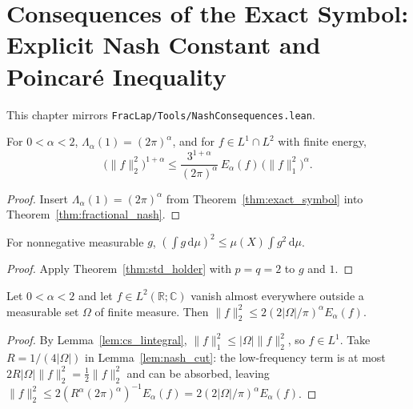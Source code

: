 \chapter{Consequences of the Exact Symbol: Explicit Nash Constant and Poincaré Inequality}

This chapter mirrors \texttt{FracLap/Tools/NashConsequences.lean}.

\begin{theorem}\label{thm:nash_explicit}
\leanok
For $0 < \alpha < 2$, $\Lambda_\alpha(1) = (2\pi)^\alpha$, and for $f \in L^1 \cap L^2$ with finite energy,
\[
  \bigl(\lVert f \rVert_2^2\bigr)^{1+\alpha} \le \frac{3^{1+\alpha}}{(2\pi)^\alpha}\, E_\alpha(f)\, \bigl(\lVert f \rVert_1^2\bigr)^\alpha.
\]
\end{theorem}

\begin{proof}
\leanok
Insert $\Lambda_\alpha(1) = (2\pi)^\alpha$ from Theorem~\ref{thm:exact_symbol} into Theorem~\ref{thm:fractional_nash}.
\end{proof}

\begin{lemma}\label{lem:cs_lintegral}
\leanok
For nonnegative measurable $g$, $(\int g\, \mathrm{d}\mu)^2 \le \mu(X) \int g^2\, \mathrm{d}\mu$.
\end{lemma}

\begin{proof}
\leanok
Apply Theorem~\ref{thm:std_holder} with $p = q = 2$ to $g$ and $1$.
\end{proof}

\begin{theorem}\label{thm:poincare_friedrichs}
\leanok
Let $0 < \alpha < 2$ and let $f \in L^2(\mathbb{R}; \mathbb{C})$ vanish almost everywhere outside a measurable set $\Omega$ of finite measure. Then $\lVert f \rVert_2^2 \le 2 (2 \lvert \Omega \rvert / \pi)^\alpha E_\alpha(f)$.
\end{theorem}

\begin{proof}
\leanok
By Lemma~\ref{lem:cs_lintegral}, $\lVert f \rVert_1^2 \le \lvert \Omega \rvert \lVert f \rVert_2^2$, so $f \in L^1$. Take $R = 1/(4\lvert \Omega \rvert)$ in Lemma~\ref{lem:nash_cut}: the low-frequency term is at most $2R\lvert \Omega \rvert \lVert f \rVert_2^2 = \frac12 \lVert f \rVert_2^2$ and can be absorbed, leaving $\lVert f \rVert_2^2 \le 2 (R^\alpha (2\pi)^\alpha)^{-1} E_\alpha(f) = 2(2\lvert \Omega \rvert/\pi)^\alpha E_\alpha(f)$.
\end{proof}
